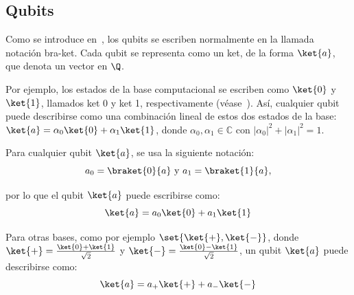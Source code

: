 \subsection{Qubits}
Como se introduce en~\cite{diracBraket}, los qubits se escriben normalmente en la llamada notación bra-ket.
Cada qubit se representa como un ket, de la forma $\ket{a}$, que denota un vector en $\Q$.

Por ejemplo, los estados de la base computacional se escriben como $\ket{0}$ y $\ket{1}$, llamados ket 0 y ket 1, respectivamente (véase~\cite{NielsenChuang}).
Así, cualquier qubit puede describirse como una combinación lineal de estos dos estados de la base: $\ket{a} =\alpha_0\ket{0} +\alpha_1 \ket{1}$, donde $\alpha_0,  \alpha_1 \in \mathbb{C}$ con $ |\alpha_0|^{2}+|\alpha_1|^{2}=1$.

\begin{notation}
	Para cualquier qubit $\ket{a}$, se usa la siguiente notación:
	\[a_{0}=\braket{0}{a}\text{ y }a_{1}=\braket{1}{a},\]
\end{notation}
por lo que el qubit $\ket{a}$ puede escribirse como:
\begin{equation}
	\label{eq:qubit-coordenadas}
	\ket{a}=a_0\ket{0}+a_1\ket{1}
\end{equation}

Para otras bases, como por ejemplo $\set{\ket{+}, \ket{-}}$, donde $\ket{+}=\frac{\ket{0}+\ket{1}}{\sqrt{2}}$ y $\ket{-}=\frac{\ket{0}-\ket{1}}{\sqrt{2}}$, un qubit $\ket{a}$ puede describirse como:
\begin{equation*}
	\ket{a}=a_+\ket{+}+a_-\ket{-}
\end{equation*}
